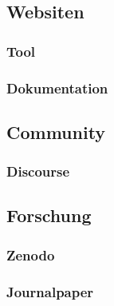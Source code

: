 \documentclass[type=zwischenbericht]{zukunftbau}
\begin{document}
\subsection{Websiten}

\subsubsection{Tool}

\subsubsection{Dokumentation}

\subsection{Community}

\subsubsection{Discourse}

\subsection{Forschung}

\subsubsection{Zenodo}

\subsubsection{Journalpaper}
\end{document}
